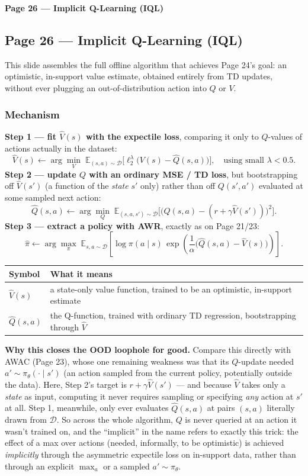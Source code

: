 \bigskip

\textbf{Page 26 --- Implicit Q-Learning (IQL)}

\subsection*{Page 26 --- Implicit Q-Learning (IQL)}

This slide assembles the full offline algorithm that achieves Page 24's goal: an optimistic, in-support value estimate, obtained entirely from TD updates, without ever plugging an out-of-distribution action into $Q$ or $V$.

\subsubsection*{Mechanism}

\textbf{Step 1 --- fit $\hat V(s)$ with the expectile loss}, comparing it only to $Q$-values of actions actually in the dataset:
\[
\hat V(s) \leftarrow \arg\min_V\; \mathbb{E}_{(s,a)\sim\mathcal{D}}\Big[\ell_2^\lambda\big(V(s) - \hat Q(s,a)\big)\Big], \quad \text{using small } \lambda < 0.5.
\]
\textbf{Step 2 --- update $Q$ with an ordinary MSE / TD loss}, but bootstrapping off $\hat V(s')$ (a function of the \emph{state} $s'$ only) rather than off $Q(s',a')$ evaluated at some sampled next action:
\[
\hat Q(s,a) \leftarrow \arg\min_Q\; \mathbb{E}_{(s,a,s')\sim\mathcal{D}}\Big[\big(Q(s,a) - (r + \gamma\hat V(s'))\big)^2\Big].
\]
\textbf{Step 3 --- extract a policy with AWR}, exactly as on Page 21/23:
\[
\hat\pi \leftarrow \arg\max_\pi\; \mathbb{E}_{s,a\sim\mathcal{D}}\left[\log\pi(a\mid s)\, \exp\!\left(\frac{1}{\alpha}\big(\hat Q(s,a) - \hat V(s)\big)\right)\right].
\]

\begin{center}
\begin{tabular}{@{}ll@{}}
\toprule
Symbol & What it means \\
\midrule
$\hat V(s)$ & a state-only value function, trained to be an optimistic, in-support estimate \\
$\hat Q(s,a)$ & the Q-function, trained with ordinary TD regression, bootstrapping through $\hat V$ \\
\bottomrule
\end{tabular}
\end{center}

\textbf{Why this closes the OOD loophole for good.} Compare this directly with AWAC (Page 23), whose one remaining weakness was that its $Q$-update needed $a'\sim\pi_\theta(\cdot\mid s')$ (an action sampled from the current policy, potentially outside the data). Here, Step 2's target is $r+\gamma\hat V(s')$ --- and because $\hat V$ takes only a \emph{state} as input, computing it never requires sampling or specifying \emph{any} action at $s'$ at all. Step 1, meanwhile, only ever evaluates $\hat Q(s,a)$ at pairs $(s,a)$ literally drawn from $\mathcal{D}$. So across the whole algorithm, $Q$ is never queried at an action it wasn't trained on, and the ``implicit'' in the name refers to exactly this trick: the effect of a max over actions (needed, informally, to be optimistic) is achieved \emph{implicitly} through the asymmetric expectile loss on in-support data, rather than through an explicit $\max_a$ or a sampled $a'\sim\pi_\theta$.
